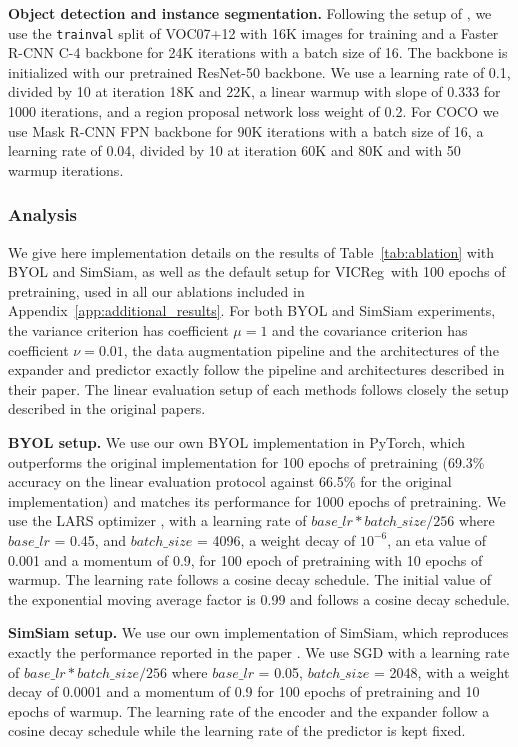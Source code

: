 \documentclass{article}
\newcommand{\algo}{VICReg}
\begin{document}
\textbf{Object detection and instance segmentation.} Following the setup of \cite{he2020moco, zbontar2021barlow}, we use the \texttt{trainval} split of VOC07+12 with 16K images for training and a Faster R-CNN C-4 backbone for 24K iterations with a batch size of 16. The backbone is initialized with our pretrained ResNet-50 backbone. We use a learning rate of 0.1, divided by 10 at iteration 18K and 22K, a linear warmup with slope of 0.333 for 1000 iterations, and a region proposal network loss weight of 0.2. For COCO we use Mask R-CNN FPN backbone for 90K iterations with a batch size of 16, a learning rate of 0.04, divided by 10 at iteration 60K and 80K and with 50 warmup iterations.

\subsubsection{Analysis} \label{app:ablation}

We give here implementation details on the results of Table~\ref{tab:ablation} with BYOL and SimSiam, as well as the default setup for \algo \ with 100 epochs of pretraining, used in all our ablations included in Appendix~\ref{app:additional_results}. For both BYOL and SimSiam experiments, the variance criterion has coefficient $\mu=1$ and the covariance criterion has coefficient $\nu=0.01$, the data augmentation pipeline and the architectures of the expander and predictor exactly follow the pipeline and architectures described in their paper. The linear evaluation setup of each methods follows closely the setup described in the original papers.

\textbf{BYOL setup.} We use our own BYOL implementation in PyTorch, which outperforms the original implementation for 100 epochs of pretraining (69.3\% accuracy on the linear evaluation protocol against 66.5\% for the original implementation) and matches its performance for 1000 epochs of pretraining. We use the LARS optimizer \cite{you2017lars}, with a learning rate of $base\_lr * batch\_size / 256$ where $base\_lr$ = 0.45, and $batch\_size$ = 4096, a weight decay of $10^{-6}$, an eta value of 0.001 and a momentum of 0.9, for 100 epoch of pretraining with 10 epochs of warmup. The learning rate follows a cosine decay schedule. The initial value of the exponential moving average factor is 0.99 and follows a cosine decay schedule. 

\textbf{SimSiam setup.} We use our own implementation of SimSiam, which reproduces exactly the performance reported in the paper \cite{chen2020simsiam}. We use SGD with a learning rate of $base\_lr * batch\_size / 256$ where $base\_lr$ = 0.05, $batch\_size$ = 2048, with a weight decay of 0.0001 and a momentum of 0.9 for 100 epochs of pretraining and 10 epochs of warmup. The learning rate of the encoder and the expander follow a cosine decay schedule while the learning rate of the predictor is kept fixed.
\end{document}
